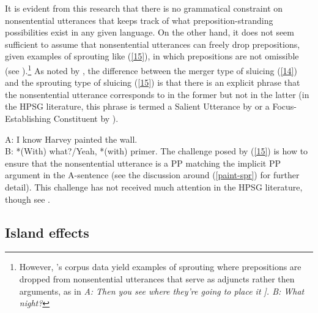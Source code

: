 It is evident from this research that there is no grammatical constraint on nonsentential utterances that keeps track of what preposition-stranding possibilities exist in any given language. On the other hand, it does not seem sufficient to assume that nonsentential utterances can freely drop prepositions, given examples of sprouting like (\ref{15}), in which prepositions are not omissible (see \citealt{Chung1995}).\footnote{However, \citet{Hardt2020}'s corpus data yield examples of sprouting where prepositions are dropped from nonsentential utterances that serve as adjuncts rather then arguments, as in \textit{A: Then you see where they’re going to place it ]. B: What night?}}  As noted by \citet[250]{Chung1995},
the difference between the
merger type of sluicing (\ref{14}) and the sprouting type of sluicing (\ref{15}) is that there is an explicit phrase that the nonsentential utterance corresponds to in the former but not in the latter (in the HPSG literature, this phrase is termed a Salient Utterance by \citealt[313]{Ginzburg:Sag:2000} or a Focus-Establishing Constituent by \citealt[234]{Ginzburg2012}). 

\ea A: I know Harvey painted the wall.\\B: *(With) what?/Yeah, *(with) primer.\label{15}\z
%
The challenge posed by (\ref{15}) is how to ensure that
the nonsentential utterance is a PP matching the implicit PP argument in 
the A-sentence (see the discussion
around 
(\ref{paint-spr}) for further detail). This challenge has not received much attention in the HPSG literature, though see \citet{Kim2015}.



\subsection{Island effects}
\label{sec-island-effects}

